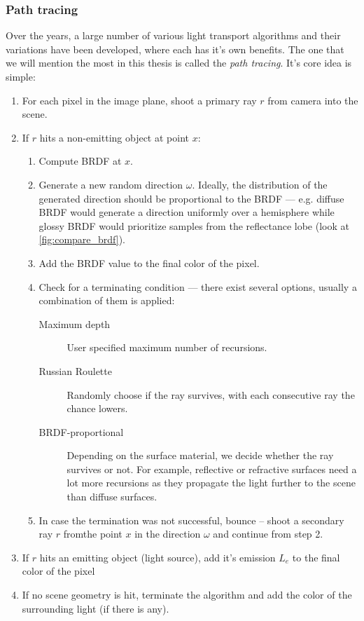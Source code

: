 \subsubsection{Path tracing}
Over the years, a large number of various light transport algorithms and their variations have been developed, where each has it's own benefits. The one that we will mention the most in this thesis is called the \emph{path tracing}. It's core idea is simple:

\renewcommand{\labelenumii}{\theenumii}
\renewcommand{\theenumii}{\theenumi.\arabic{enumii}.}
\begin{enumerate}
	\item For each pixel in the image plane, shoot a primary ray $r$ from camera into the scene.
	\item If $r$ hits a non-emitting object at point $x$:
	\begin{enumerate}
		\item Compute BRDF at $x$.
		\item Generate a new random direction $\omega$. Ideally, the distribution of the generated direction should be proportional to the BRDF --- e.g. diffuse BRDF would generate a direction  uniformly over a hemisphere while glossy BRDF would prioritize samples from the reflectance lobe (look at \autoref{fig:compare_brdf}).
		\item Add the BRDF value to the final color of the pixel.
		\item Check for a terminating condition --- there exist several options, usually a combination of them is applied:
			\begin{description}
				\item [Maximum depth] User specified maximum number of recursions.
				\item [Russian Roulette] Randomly choose if the ray survives, with each consecutive ray the chance lowers.
				\item [BRDF-proportional] Depending on the surface material, we decide whether the ray survives or not. For example, reflective or refractive surfaces need a lot more recursions as they propagate the light further to the scene than diffuse surfaces.
			\end{description}
		\item In case the termination was not successful, bounce -- shoot a secondary ray $r$ fromthe  point $x$ in the direction $\omega$ and continue from step 2.
	\end{enumerate}
	\item If $r$ hits an emitting object (light source), add it's emission $L_e$ to the final color of the pixel
	\item If no scene geometry is hit, terminate the algorithm and add the color of the surrounding light (if there is any).
\end{enumerate}

